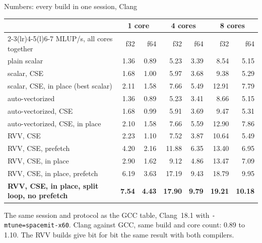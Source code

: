 \documentclass[aspectratio=169,10pt,t]{beamer}
\newcommand{\code}[1]{\texttt{#1}}
\begin{document}
\begin{frame}{Numbers: every build in one session, Clang}
  \vspace{1mm}
  \centering
  {\footnotesize\renewcommand{\arraystretch}{1.05}
  \begin{tabular}{@{}lrrrrrr@{}}
    \toprule
    & \multicolumn{2}{c}{\textbf{1 core}} & \multicolumn{2}{c}{\textbf{4 cores}}
      & \multicolumn{2}{c}{\textbf{8 cores}}\\
    \cmidrule(lr){2-3}\cmidrule(lr){4-5}\cmidrule(l){6-7}
    MLUP/s, all cores together & f32 & f64 & f32 & f64 & f32 & f64\\
    \midrule
    plain scalar & 1.36 & 0.89 & 5.23 & 3.39 & 8.54 & 5.15\\
    scalar, CSE & 1.68 & 1.00 & 5.97 & 3.68 & 9.38 & 5.29\\
    scalar, CSE, in place (best scalar) & 2.11 & 1.58 & 7.66 & 5.49 & 12.91 & 7.79\\
    \midrule
    auto-vectorized & 1.36 & 0.89 & 5.23 & 3.41 & 8.66 & 5.15\\
    auto-vectorized, CSE & 1.68 & 0.99 & 5.91 & 3.69 & 9.47 & 5.31\\
    auto-vectorized, CSE, in place & 2.10 & 1.58 & 7.66 & 5.59 & 12.90 & 7.86\\
    \midrule
    RVV, CSE & 2.23 & 1.10 & 7.52 & 3.87 & 10.64 & 5.49\\
    RVV, CSE, prefetch & 4.20 & 2.16 & 11.88 & 6.35 & 13.40 & 6.95\\
    RVV, CSE, in place & 2.90 & 1.62 & 9.12 & 4.86 & 13.47 & 7.09\\
    RVV, CSE, in place, prefetch & 6.19 & 3.63 & 17.19 & 9.43 & 18.79 & 9.95\\
    \textbf{RVV, CSE, in place, split loop, no prefetch} & \textbf{7.54} & \textbf{4.43} & \textbf{17.90}
      & \textbf{9.79} & \textbf{19.21} & \textbf{10.18}\\
    \bottomrule
  \end{tabular}\par}

  \vspace{3mm}
  \raggedright
  {\scriptsize\color{psgray}
  The same session and protocol as the GCC table, Clang~18.1 with \code{-mtune=spacemit-x60}.
  Clang against GCC, same build and core count: 0.89 to 1.10. The RVV builds give bit for bit the
  same result with both compilers.\par}
\end{frame}
\end{document}
